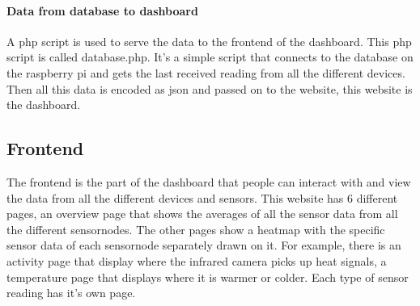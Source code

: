 \documentclass[11pt,a4paper]{article}
\begin{document}
\paragraph{Data from database to dashboard}
A php script is used to serve the data to the frontend of the dashboard. This php script is called database.php. 
It's a simple script that connects to the database on the raspberry pi and gets the last received reading from all the different devices.
Then all this data is encoded as json and passed on to the website, this website is the dashboard. 

\subsection{Frontend}
The frontend is the part of the dashboard that people can interact with and view the data from all the different devices and sensors.
This website has 6 different pages, an overview page that shows the averages of all the sensor data from all the different sensornodes.
The other pages show a heatmap with the specific sensor data of each sensornode separately drawn on it. 
For example, there is an activity page that display where the infrared camera picks up heat signals, a temperature page that displays where it is warmer or colder.
Each type of sensor reading has it's own page.
\end{document}

